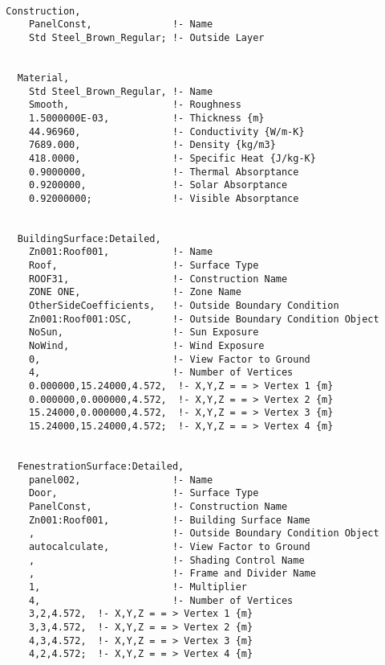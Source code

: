 \begin{lstlisting}

  Construction,
      PanelConst,              !- Name
      Std Steel_Brown_Regular; !- Outside Layer


    Material,
      Std Steel_Brown_Regular, !- Name
      Smooth,                  !- Roughness
      1.5000000E-03,           !- Thickness {m}
      44.96960,                !- Conductivity {W/m-K}
      7689.000,                !- Density {kg/m3}
      418.0000,                !- Specific Heat {J/kg-K}
      0.9000000,               !- Thermal Absorptance
      0.9200000,               !- Solar Absorptance
      0.92000000;              !- Visible Absorptance


    BuildingSurface:Detailed,
      Zn001:Roof001,           !- Name
      Roof,                    !- Surface Type
      ROOF31,                  !- Construction Name
      ZONE ONE,                !- Zone Name
      OtherSideCoefficients,   !- Outside Boundary Condition
      Zn001:Roof001:OSC,       !- Outside Boundary Condition Object
      NoSun,                   !- Sun Exposure
      NoWind,                  !- Wind Exposure
      0,                       !- View Factor to Ground
      4,                       !- Number of Vertices
      0.000000,15.24000,4.572,  !- X,Y,Z = = > Vertex 1 {m}
      0.000000,0.000000,4.572,  !- X,Y,Z = = > Vertex 2 {m}
      15.24000,0.000000,4.572,  !- X,Y,Z = = > Vertex 3 {m}
      15.24000,15.24000,4.572;  !- X,Y,Z = = > Vertex 4 {m}


    FenestrationSurface:Detailed,
      panel002,                !- Name
      Door,                    !- Surface Type
      PanelConst,              !- Construction Name
      Zn001:Roof001,           !- Building Surface Name
      ,                        !- Outside Boundary Condition Object
      autocalculate,           !- View Factor to Ground
      ,                        !- Shading Control Name
      ,                        !- Frame and Divider Name
      1,                       !- Multiplier
      4,                       !- Number of Vertices
      3,2,4.572,  !- X,Y,Z = = > Vertex 1 {m}
      3,3,4.572,  !- X,Y,Z = = > Vertex 2 {m}
      4,3,4.572,  !- X,Y,Z = = > Vertex 3 {m}
      4,2,4.572;  !- X,Y,Z = = > Vertex 4 {m}



\end{lstlisting}

